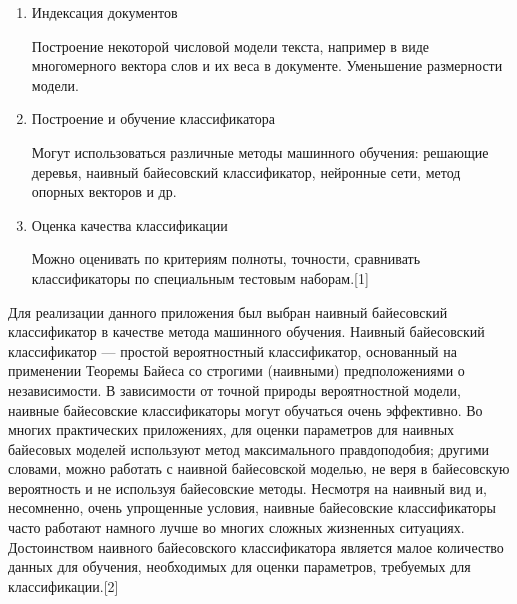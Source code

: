 \documentclass[14pt,a4paper]{extreport}
\begin{document}
    \begin{enumerate}
      \item  Индексация документов
      \\ \par Построение некоторой числовой модели текста, например в виде многомерного вектора слов и их веса в документе. Уменьшение размерности модели.
      \item  Построение и обучение классификатора
      \\ \par Могут использоваться различные методы машинного обучения: решающие деревья, наивный байесовский классификатор, нейронные сети, метод опорных векторов и др.
      \item  Оценка качества классификации
      \\ \par Можно оценивать по критериям полноты, точности, сравнивать классификаторы по специальным тестовым наборам.[1]
    \end{enumerate}
    \par Для реализации данного приложения был выбран наивный байесовский классификатор в качестве метода машинного обучения. Наивный байесовский классификатор — простой вероятностный классификатор, основанный на применении Теоремы Байеса со строгими (наивными) предположениями о независимости. В зависимости от точной природы вероятностной модели, наивные байесовские классификаторы могут обучаться очень эффективно. Во многих практических приложениях, для оценки параметров для наивных байесовых моделей используют метод максимального правдоподобия; другими словами, можно работать с наивной байесовской моделью, не веря в байесовскую вероятность и не используя байесовские методы. Несмотря на наивный вид и, несомненно, очень упрощенные условия, наивные байесовские классификаторы часто работают намного лучше во многих сложных жизненных ситуациях. Достоинством наивного байесовского классификатора является малое количество данных для обучения, необходимых для оценки параметров, требуемых для классификации.[2]

	\newpage
\end{document}
